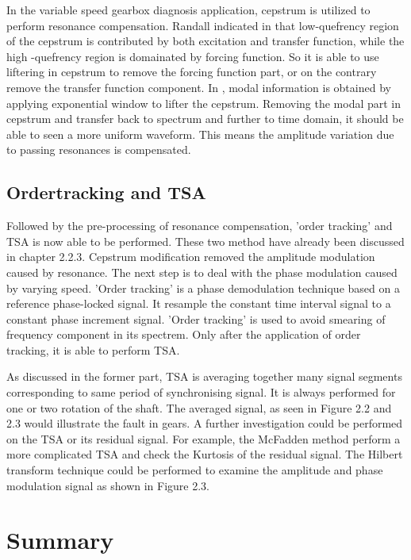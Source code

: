 In the variable speed gearbox diagnosis application, cepstrum is utilized to perform resonance compensation. Randall indicated in \cite{resonance} that low-quefrency region of the cepstrum is contributed by both excitation and transfer function, while the high -quefrency region is domainated by forcing function. So it is able to use liftering in cepstrum to remove the forcing function part, or on the contrary remove the transfer function component. In \cite{varyspeed}, modal information is obtained by applying exponential window  to lifter the cepstrum. Removing the modal part in cepstrum and transfer back to spectrum and further to time domain, it should be able to seen a more uniform waveform. This means the amplitude variation due to passing resonances is compensated.

\subsection{Ordertracking and TSA}

Followed by the pre-processing of resonance compensation, 'order tracking' and TSA is now able to be performed. These two method have already been discussed in chapter 2.2.3. Cepstrum modification removed the amplitude modulation caused by resonance. The next step is to deal with the phase modulation caused by varying speed. 'Order tracking' is a phase demodulation technique based on a reference phase-locked signal. It resample the constant time interval signal to a constant phase increment signal. 'Order tracking' is used to avoid smearing of frequency component in its spectrem. Only after the application of order tracking, it is able to perform TSA.

As discussed in the former part, TSA is averaging together many signal segments corresponding to same period of synchronising signal. It is always performed for one or two rotation of the shaft. The averaged signal, as seen in Figure 2.2 and 2.3 would illustrate the fault in gears. A further investigation could be performed on the TSA or its residual signal. For example, the McFadden method perform a more complicated TSA and check the Kurtosis of the residual signal. The Hilbert transform technique could be performed to examine the amplitude and phase modulation signal as shown in Figure 2.3.

\section{Summary}

